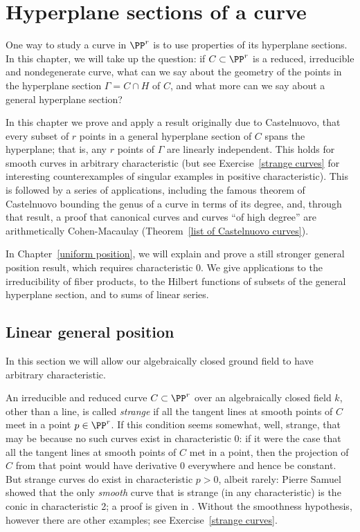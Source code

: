 


\chapter{Hyperplane sections of a curve}\label{linear general position chapter}

One way to study a curve in $\PP^r$ is to use properties of its hyperplane sections. In this chapter, we will take up the question: if $C \subset \PP^r$ is a reduced, irreducible and nondegenerate curve, what can we say about the geometry of the points in the  hyperplane section $\Gamma = C \cap H$ of $C$, and what more can we say about a general hyperplane section?

In this chapter we prove and apply a result originally due to Castelnuovo, that every subset of $r$ points in a
general hyperplane section of $C$ spans the hyperplane; that is, any $r$ points of $\Gamma$ are linearly independent. This 
holds for smooth curves in arbitrary characteristic (but see Exercise~\ref{strange curves} for
interesting counterexamples of singular examples in positive characteristic). This is followed by a series of applications,
including the famous theorem of Castelnuovo bounding the genus of a curve in terms of its degree,
and, through that result, a proof that canonical curves and curves ``of high degree'' are arithmetically Cohen-Macaulay (Theorem~\ref{list of Castelnuovo curves}).

In Chapter~\ref{uniform position}, we will explain and prove a still stronger general position result, which requires characteristic 0. We give applications to the irreducibility of fiber products, to the Hilbert functions of subsets of the
general hyperplane section, and to sums of linear series.


\section{Linear general position}\label{linearly general position section}
In this section we will allow our algebraically closed ground field to have arbitrary characteristic. 

An irreducible and reduced curve
$C\subset \PP^r$ over an algebraically closed field $k$, other than a line, is called \emph{strange} if
all the tangent lines at smooth points of $C$ meet in a point $p\in \PP^r$. If this condition seems somewhat, well, strange, that may be because no such curves exist in characteristic 0: if it were the case that all the tangent lines at smooth points of $C$ met in a point, then the projection of $C$ from that point would have derivative 0 everywhere and hence be constant. But strange curves do exist in characteristic $p > 0$, albeit rarely: Pierre Samuel showed that the only \emph{smooth} curve that is strange (in any characteristic) is the conic in characteristic 2; a proof is given in \cite[Theorem IV.3.9]{Hartshorne1977}. Without the smoothness hypothesis, however there are other examples; see Exercise~\ref{strange curves}.


